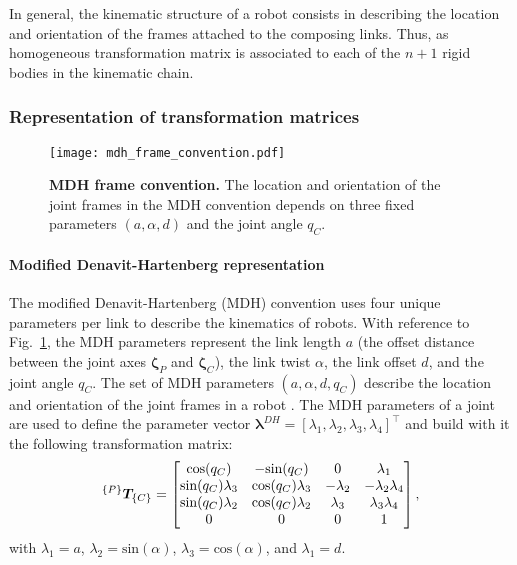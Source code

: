In general, the kinematic structure of a robot consists in describing the location and orientation of the frames attached to the composing links. Thus, as homogeneous transformation matrix is associated to each of the $n+1$ rigid bodies in the kinematic chain.

\subsubsection{Representation of transformation matrices}
\begin{figure}
	\begin{center}
		\texttt{[image: mdh\_frame\_convention.pdf]}
		\caption{\textbf{MDH frame convention.} The location and orientation of the joint frames in the MDH convention depends on three fixed parameters $(a,\alpha,d)$ and the joint angle $q_C$.}
		\label{fig:mdh_frame_convention}
	\end{center}
\end{figure}
\paragraph*{Modified Denavit-Hartenberg representation} The modified Denavit-Hartenberg (MDH) convention uses four unique parameters per link to describe the kinematics of robots. With reference to Fig.~\ref{fig:mdh_frame_convention}, the MDH parameters represent the
link length $a$ (the offset distance between the joint axes $\bm{\zeta}_P$ and $\bm{\zeta}_C$), the link twist $\alpha$, the link offset $d$, and the joint angle $q_C$. The set of MDH parameters $\left(a,\alpha,d,q_C\right)$ describe the location and orientation of the joint frames in a robot \cite{Craig1989Introductionroboticsmechanics}. The MDH parameters of a joint are used to define the parameter vector  $\bm{\lambda}^{DH} = \left[\lambda_1,\lambda_2,\lambda_3,\lambda_4\right]^\intercal$ and build with it the following transformation matrix:
\begin{equation}
 ^{\left\lbrace P \right\rbrace}\bm{T}_{\left\lbrace C \right\rbrace} =
 \begin{bmatrix}
   	\text{cos}(q_C)         &     -\text{sin}(q_C)    &      0    &      \lambda_1\\      
   	\text{sin}(q_C)\lambda_3& \text{cos}(q_C)\lambda_3& -\lambda_2& -\lambda_2\lambda_4\\
   	\text{sin}(q_C)\lambda_2& \text{cos}(q_C)\lambda_2&  \lambda_3&  \lambda_3\lambda_4\\
   	0                       &         0               &      0    &           1          
 \end{bmatrix},
\end{equation} 
with $\lambda_1 = a$, $\lambda_2 = \text{sin}(\alpha)$, $\lambda_3 = \text{cos}(\alpha)$, and $\lambda_1 = d$. 

